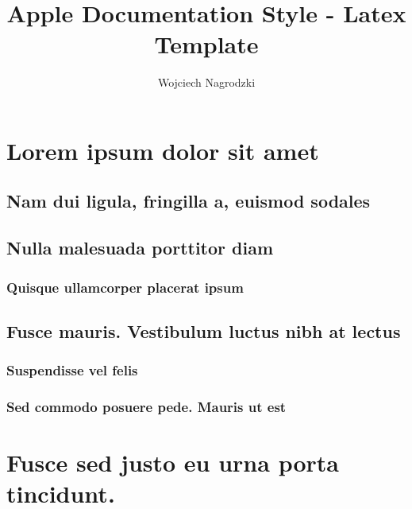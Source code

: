 \documentclass[10pt]{extarticle}
\begin{document}
\begin{titlepage} 
\title{Apple Documentation Style - Latex Template}
\author{Wojciech Nagrodzki}
\maketitle
\end{titlepage}

\tableofcontents

\section{Lorem ipsum dolor sit amet}
\lipsum[1]

\subsection{Nam dui ligula, fringilla a, euismod sodales}
\lipsum[2]

\subsection{Nulla malesuada porttitor diam}
\lipsum[3]
\subsubsection{Quisque ullamcorper placerat ipsum}
\lipsum[4]

\subsection{Fusce mauris. Vestibulum luctus nibh at lectus}
\lipsum[5]

\subsubsection{Suspendisse vel felis}
\lipsum[6]

\subsubsection{Sed commodo posuere pede. Mauris ut est}
\lipsum[7]

\section{Fusce sed justo eu urna porta tincidunt.}
\end{document}
